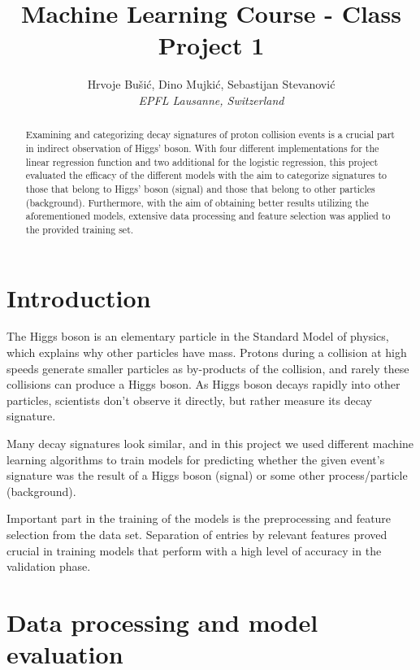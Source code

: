 \documentclass[10pt,conference,compsocconf]{IEEEtran}
\begin{document}
\title{Machine Learning Course - Class Project 1}

\author{
  Hrvoje Bušić, Dino Mujkić, Sebastijan Stevanović\\
  \textit{EPFL Lausanne, Switzerland}
}

\maketitle

\begin{abstract}
Examining and categorizing decay signatures of proton collision events is a crucial part in indirect observation of Higgs' boson. With four different implementations for the linear regression function and two additional for the logistic regression, this project evaluated the efficacy of the different models with the aim to categorize signatures to those that belong to Higgs' boson (signal) and those that belong to other particles (background). Furthermore, with the aim of obtaining better results utilizing the aforementioned models, extensive data processing and feature selection was applied to the provided training set.
\end{abstract}

\section{Introduction}

The Higgs boson is an elementary particle in the Standard Model of physics, which explains why other particles have mass. Protons during a collision at high speeds generate smaller particles as by-products of the collision, and rarely these collisions can produce a Higgs boson. As Higgs boson decays rapidly into other particles, scientists don't observe it directly, but rather measure its decay signature. 

Many decay signatures look similar, and in this project we used different machine learning algorithms to train models for predicting whether the given event's signature was the result of a Higgs boson (signal) or some other process/particle (background).

Important part in the training of the models is the preprocessing and feature selection from the data set. Separation of entries by relevant features proved crucial in training models that perform with a high level of accuracy in the validation phase.

\section{Data processing and model evaluation}
\end{document}
